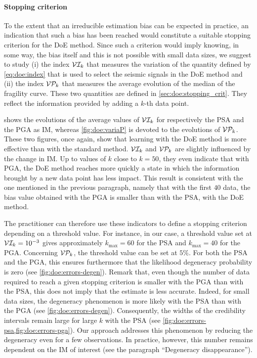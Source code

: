     \paragraph{{Stopping criterion}} {To the extent that an irreducible estimation bias can be expected in practice, an indication that such a bias has been reached would constitute a suitable stopping criterion for the DoE method. Since such a criterion would imply knowing, in some way, the bias itself and this is not possible with small data sizes, we suggest to study (i) the index $\mathcal{V}\mathcal{I}_k$ that measures the variation of the  quantity defined by \cref{eq:doe:index} that is used to select the seismic signals in the DoE method and (ii) the index $\mathcal{V}\mathcal{P}_k$ that measures the average evolution of the median of the fragility curve. These two quantities are defined in \cref{sec:doe:stopping_crit}. They reflect the information provided by adding a $k$-th data point. 

      shows the evolutions of the average values of $\mathcal{V}\mathcal{I}_k$ for respectively the PSA and the PGA as IM, whereas  \cref{fig:doe:variaP} is devoted to the evolutions of $\mathcal{V}\mathcal{P}_k$. These two figures, once again, show that learning with the DoE method is more effective than with the standard method. $\mathcal{V}\mathcal{I}_k$ and $\mathcal{V}\mathcal{P}_k$ are slightly influenced by the change in IM. Up to values of $k$ close to $k=50$, they even indicate that with PGA, the DoE method reaches more quickly a state in which the information brought by a new data point has less impact. This result is consistent with the one mentioned in the previous paragraph, namely that with the first $40$ data, the bias value obtained with the PGA is smaller than with the PSA, with the DoE method.
    
    The practitioner can therefore use these indicators to define a stopping criterion depending on a threshold value. For instance, in our case, a threshold value set at $\mathcal{V}\mathcal{I}_k = 10^{-3}$ gives approximately $k_{\max} = 60$ for the PSA and $k_{\max} = 40$ for the PGA. Concerning $\mathcal{V}\mathcal{P}_k$, the threshold value can be set at $5 \% $. For both the PSA and the PGA, this ensures furthermore that the likelihood degeneracy probability is zero (see  \cref{fig:doe:errors-degen}). 
    Remark that, even though the number of data required to reach a given stopping criterion is smaller with the PGA than with the PSA, this does not imply that the estimate is less accurate. Indeed, for small data sizes, the degeneracy phenomenon is more likely with the PSA than with the PGA (see  \cref{fig:doe:errors-degen}). Consequently, the widths of the credibility intervals remain large for large $k$ with the PSA (see \cref{fig:doe:errors-psa,fig:doe:errors-pga}). Our approach addresses this phenomenon by reducing the degeneracy even for a few observations. In practice, however, this number remains dependent on the IM of interest (see the paragraph ``Degeneracy disappearance'').
    
    }
        
